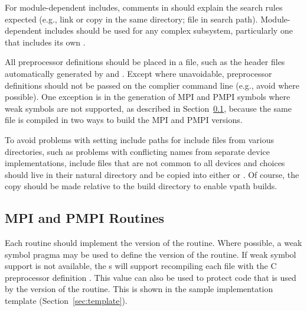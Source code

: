\documentclass{article}
\begin{document}


For module-dependent includes, comments in  should explain the
search rules expected (e.g., link or copy in the same directory; file in
search path).  Module-dependent includes should be used for any complex
subsystem, particularly one that includes its own .

All preprocessor definitions should be placed in a file, such as the
header files automatically generated by
 and .  Except
where unavoidable, preprocessor definitions should not be passed on
the complier command line (e.g., avoid  where
possible). One exception is in the generation of MPI and PMPI symbols
where weak symbols are not supported, as described in
Section~\ref{sec:pmpi-routines}, because the same file is compiled in
two ways to build the MPI and PMPI versions.

To avoid problems with setting include paths for include files from
various directories, such as problems with conflicting names from
separate device implementations, include files that are not common to
all devices and choices should live in their natural directory and be
copied into either  or .  Of
course, the copy should be made relative to the build directory to
enable vpath builds.

\subsection{MPI and PMPI Routines}
\label{sec:pmpi-routines}
Each routine should implement the  version of the routine.
Where possible, a weak symbol pragma may be used to define the
 version of the routine.  If weak symbol support is not
available, the s will support recompiling each file
with the C preprocessor definition .  This value
can also be used to protect code that is used by the 
version of the routine.  This is shown in the sample implementation template
(Section~\ref{sec:template}).
\end{document}
